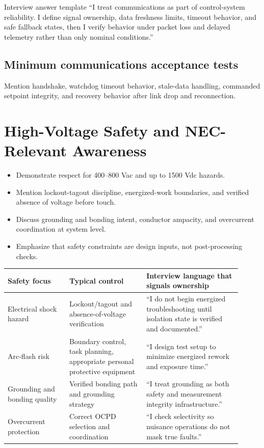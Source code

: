 \documentclass[11pt]{article}
\begin{document}
\begin{answerbox}{Interview answer template}
``I treat communications as part of control-system reliability. I define signal
ownership, data freshness limits, timeout behavior, and safe fallback states,
then I verify behavior under packet loss and delayed telemetry rather than only
nominal conditions.''
\end{answerbox}

\subsection{Minimum communications acceptance tests}
Mention handshake, watchdog timeout behavior, stale-data handling, commanded
setpoint integrity, and recovery behavior after link drop and reconnection.

\section{High-Voltage Safety and NEC-Relevant Awareness}

\begin{itemize}
  \item Demonstrate respect for 400--800 Vac and up to 1500 Vdc hazards.
  \item Mention lockout-tagout discipline, energized-work boundaries, and verified absence of voltage before touch.
  \item Discuss grounding and bonding intent, conductor ampacity, and overcurrent coordination at system level.
  \item Emphasize that safety constraints are design inputs, not post-processing checks.
\end{itemize}

\begin{table}[h]
\centering
\begin{tabular}{p{0.24\linewidth}p{0.3\linewidth}p{0.37\linewidth}}
\toprule
Safety focus & Typical control & Interview language that signals ownership \\
\midrule
Electrical shock hazard & Lockout/tagout and absence-of-voltage verification & ``I do not begin energized troubleshooting until isolation state is verified and documented.'' \\
Arc-flash risk & Boundary control, task planning, appropriate personal protective equipment & ``I design test setup to minimize energized rework and exposure time.'' \\
Grounding and bonding quality & Verified bonding path and grounding strategy & ``I treat grounding as both safety and measurement integrity infrastructure.'' \\
Overcurrent protection & Correct OCPD selection and coordination & ``I check selectivity so nuisance operations do not mask true faults.'' \\
\bottomrule
\end{tabular}
\end{table}
\end{document}
